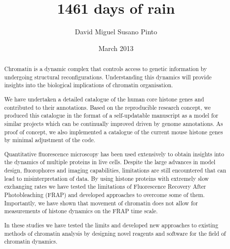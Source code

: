 \documentclass[12pt,a4paper,twoside,openright,draft]{memoir}
\author{David Miguel Susano Pinto}
\date{March 2013} %
\title{1461 days of rain} %
\begin{document}
  \frontmatter

  \maketitle


  \clearpage
  \tableofcontents
  \clearpage
  \listoffigures
  \clearpage
  \listoftables

  \clearpage
  \begin{abstract}  %

    Chromatin is a dynamic complex that controls access to genetic information by
    undergoing structural reconfigurations. Understanding this dynamics will
    provide insights into the biological implications of chromatin organisation.

    We have undertaken a detailed catalogue of
    the human core histone genes and contributed to
    their annotations. Based on the reproducible research concept,
    we produced this
    catalogue in the format of a self-updatable manuscript
    as a model for similar projects
    which can be continually improved driven by genome annotations.
    As proof of concept, we
    also implemented a catalogue of the current mouse
    histone genes by minimal adjustment of the code.

    Quantitative fluorescence microscopy has been used extensively to obtain insights
    into the dynamics of multiple proteins in live cells. Despite the large advances in
    model design, fluorophores and imaging capabilities, limitations are still
    encountered that can lead to misinterpretation of data.
    By using histone proteins with extremely slow exchanging rates we have tested the
    limitations of Fluorescence Recovery After Photobleaching (FRAP) and developed
    approaches to overcome some of them. Importantly, we have shown that movement of
    chromatin does not allow for measurements of histone dynamics on the FRAP time scale.


    In these studies we have tested the limits and developed new
    approaches to existing methods of chromatin analysis by designing
    novel reagents and software for the field of chromatin dynamics.

  \end{abstract}

  \mainmatter
\end{document}
